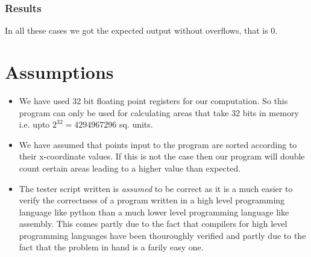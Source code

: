 \documentclass[hidelinks,12pt]{article}
\begin{document}
\subsubsection{Results}
In all these cases we got the expected output without overflows, that is 0.
\section{Assumptions}
\begin{itemize}
    \item We have used 32 bit floating point registers for our computation. So this program can only be used for calculating areas that take 32
    bits in memory i.e. upto $2^{32} = 4294967296$ sq. units.
    \item We have assumed that points input to the program are sorted according to their x-coordinate values. If this is not the case then our
    program will double count certain areas leading to a higher value than expected.
    \item The tester script written is \textit{assumed} to be correct as it is a much easier to verify the correctness of a program written in a high level
    programming language like python than a much lower level programming language like assembly. This comes partly due to the fact that compilers
    for high level programming languages have been thouroughly verified and partly due to the fact that the problem in hand is a farily easy one.
\end{itemize}
\end{document}
